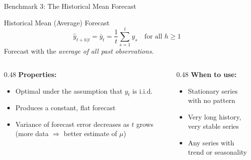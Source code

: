 \documentclass[aspectratio=169, 11pt]{beamer}
\begin{document}
\begin{frame}{Benchmark 3: The Historical Mean Forecast}
  \begin{definitionbox}{Historical Mean (Average) Forecast}
    \[
      \hat{y}_{t+h|t} = \bar{y}_t = \frac{1}{t}\sum_{s=1}^{t} y_s
      \quad \text{for all } h \geq 1
    \]
    Forecast with the \emph{average of all past observations}.
  \end{definitionbox}
  \vspace{0.1cm}
  \begin{columns}[T]
    \begin{column}{0.48\textwidth}
      \textbf{Properties:}
      \begin{itemize}
        \item Optimal under the assumption that $y_t$ is i.i.d.
        \item Produces a constant, flat forecast
        \item Variance of forecast error decreases as $t$ grows
              (more data $\Rightarrow$ better estimate of $\mu$)
      \end{itemize}
    \end{column}
    \begin{column}{0.48\textwidth}
      \textbf{When to use:}
      \begin{itemize}
        \item[\pos{$\checkmark$}] Stationary series with no pattern
        \item[\pos{$\checkmark$}] Very long history, very stable series
        \item[\negc{$\times$}] Any series with trend or seasonality
      \end{itemize}
      \vspace{0.2cm}
    \end{column}
  \end{columns}
\end{frame}
\end{document}
